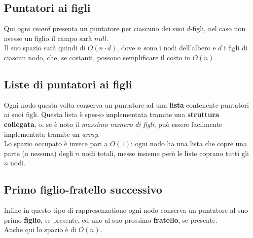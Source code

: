 \documentclass{article}
\begin{document}
\subsection*{Puntatori ai figli}
Qui ogni \textit{record} presenta un puntatore per ciascuno dei suoi $d$-figli, nel caso non avesse
un figlio il campo sarà $null$. \\
Il suo spazio sarà quindi di $O(n \cdot d)$, dove $n$ sono i nodi dell'albero e $d$ i figli di ciascun
nodo, che, se costanti, possono semplificare il costo in $O(n)$.


\subsection*{Liste di puntatori ai figli}
Ogni nodo questa volta conserva un puntatore ad una \textbf{lista} contenente puntatori ai suoi figli.
Questa lista è spesso implementata tramite una \textbf{struttura collegata}, o, se è noto 
il \textit{massimo numero di figli}, può essere facilmente implementata tramite un \textit{array}. \\
Lo spazio occupato è invece pari a $O(1)$: ogni nodo ha una lista che copre una parte (o nessuna) 
degli $n$ nodi totali, messe insieme però le liste coprano tutti gli $n$ nodi.

\subsection*{Primo figlio-fratello successivo}
Infine in questo tipo di rappresenzatione ogni nodo conserva un puntatore al suo primo \textbf{figlio}, 
se presente, ed uno al suo prossimo \textbf{fratello}, se presente. \\
Anche qui lo spazio è di $O(n)$.
\end{document}
